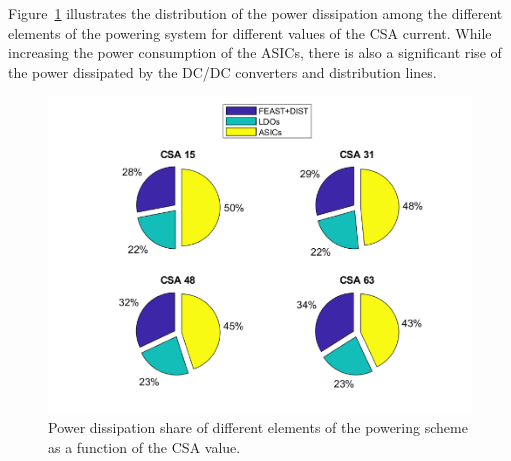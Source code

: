 Figure~\ref{fig_power_CSA} illustrates the distribution of the power dissipation among the different elements of the powering system for different values of the \gls{CSA} current. While increasing the power consumption of the \glspl{ASIC}, there is also a  significant rise of the power dissipated by the DC/DC converters and distribution lines. %

\begin{figure}[h!]
\centering
\includegraphics[width=0.6\columnwidth]{Chapter6/DCS/images/POBpie.png}
\caption{Power dissipation share of different elements of the powering scheme as a function of the \gls{CSA} value.}
\label{fig_power_CSA}
\end{figure}

